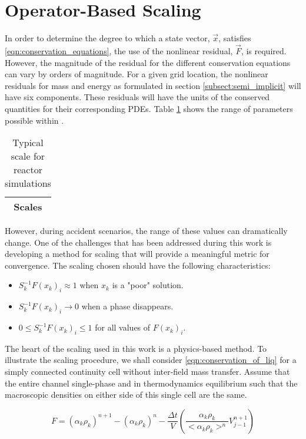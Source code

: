 \section{Operator-Based Scaling}
\label{sect:operator_scaling}
In order to determine the degree to which a state vector, $\vec{x}$, satisfies \eqref{eqn:conservation_equations}, the use of the nonlinear residual, $\vec{F}$, is required.
However, the magnitude of the residual for the different conservation equations can vary by orders of magnitude. 
For a given grid location, the nonlinear residuals for mass and energy as formulated in section \ref{subsect:semi_implicit} will have six components.
These residuals will have the units of the conserved quantities for their corresponding PDEs.
Table \ref{tab:scaling_units_scales} shows the range of parameters possible within \cobra{}.

\begin{table}[ht]
\centering
\begin{tabular}{@{}c@{}} \toprule
Scales \\
\bottomrule  
\end{tabular}
\caption{Typical scale for reactor simulations}
\label{tab:scaling_units_scales}
\end{table}

However, during accident scenarios, the range of these values can dramatically change.
One of the challenges that has been addressed during this work is developing a method for scaling that will provide a meaningful metric for convergence.
The scaling chosen should have the following characteristics:
\begin{itemize}
\item{$S^{-1}_k F(x_k)_i \approx 1$ when $x_k$ is a "poor" solution.}
\item{$S^{-1}_k F(x_k)_i \rightarrow 0$ when a phase disappears.}
\item{$0 \leq S^{-1}_k F(x_k)_i \leq 1 $ for all values of $F(x_k)_i$.}
\end{itemize}

The heart of the scaling used in this work is a physics-based method.
To illustrate the scaling procedure, we shall consider \eqref{eqn:conservation_of_liq} for a simply connected continuity cell without inter-field mass transfer.
Assume that the entire channel single-phase and in thermodynamics equilibrium such that the macroscopic densities on either side of this single cell are the same.

\begin{equation}
F = \left(\alpha_k \rho_k\right)^{n+1} - \left( \alpha_k \rho_k \right)^n - \frac{\Delta t}{V} \left( \frac{\alpha_k \rho_k }{<\alpha_k \rho_k>^n} V^{n+1}_{j-1} \right)
\end{equation}

